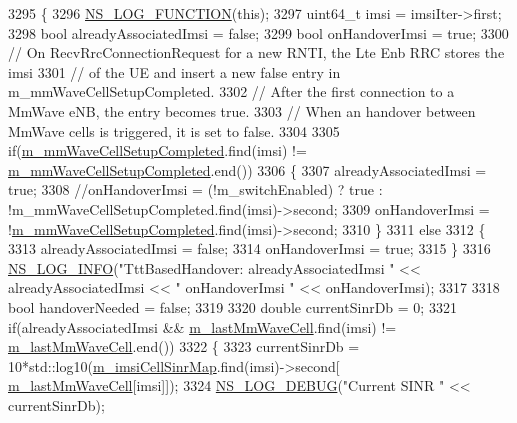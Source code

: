 \begin{DoxyCode}
3295 \{
3296  \hyperlink{log-macros-disabled_8h_a90b90d5bad1f39cb1b64923ea94c0761}{NS\_LOG\_FUNCTION}(\textcolor{keyword}{this});
3297         uint64\_t imsi = imsiIter->first;
3298   \textcolor{keywordtype}{bool} alreadyAssociatedImsi = \textcolor{keyword}{false};
3299   \textcolor{keywordtype}{bool} onHandoverImsi = \textcolor{keyword}{true};
3300   \textcolor{comment}{// On RecvRrcConnectionRequest for a new RNTI, the Lte Enb RRC stores the imsi}
3301   \textcolor{comment}{// of the UE and insert a new false entry in m\_mmWaveCellSetupCompleted.}
3302   \textcolor{comment}{// After the first connection to a MmWave eNB, the entry becomes true.}
3303   \textcolor{comment}{// When an handover between MmWave cells is triggered, it is set to false.}
3304 
3305   \textcolor{keywordflow}{if}(\hyperlink{classns3_1_1LteEnbRrc_ad19d6f4c123115e1d13e34609781ab20}{m\_mmWaveCellSetupCompleted}.find(imsi) != 
      \hyperlink{classns3_1_1LteEnbRrc_ad19d6f4c123115e1d13e34609781ab20}{m\_mmWaveCellSetupCompleted}.end())
3306   \{
3307     alreadyAssociatedImsi = \textcolor{keyword}{true};
3308     \textcolor{comment}{//onHandoverImsi = (!m\_switchEnabled) ? true : !m\_mmWaveCellSetupCompleted.find(imsi)->second;}
3309     onHandoverImsi = !\hyperlink{classns3_1_1LteEnbRrc_ad19d6f4c123115e1d13e34609781ab20}{m\_mmWaveCellSetupCompleted}.find(imsi)->second;
3310   \}
3311   \textcolor{keywordflow}{else}
3312   \{
3313     alreadyAssociatedImsi = \textcolor{keyword}{false};
3314     onHandoverImsi = \textcolor{keyword}{true};
3315   \}
3316   \hyperlink{group__logging_gafbd73ee2cf9f26b319f49086d8e860fb}{NS\_LOG\_INFO}(\textcolor{stringliteral}{"TttBasedHandover: alreadyAssociatedImsi "} << alreadyAssociatedImsi << \textcolor{stringliteral}{"
       onHandoverImsi "} << onHandoverImsi);
3317 
3318   \textcolor{keywordtype}{bool} handoverNeeded = \textcolor{keyword}{false};
3319 
3320   \textcolor{keywordtype}{double} currentSinrDb = 0;
3321   \textcolor{keywordflow}{if}(alreadyAssociatedImsi && \hyperlink{classns3_1_1LteEnbRrc_a0d7b04f0383b0dc3f6a7360b87cbaeee}{m\_lastMmWaveCell}.find(imsi) != 
      \hyperlink{classns3_1_1LteEnbRrc_a0d7b04f0383b0dc3f6a7360b87cbaeee}{m\_lastMmWaveCell}.end())
3322   \{
3323     currentSinrDb = 10*std::log10(\hyperlink{classns3_1_1LteEnbRrc_a72b3ce5c1f8495e96bfc0f384ecf3a96}{m\_imsiCellSinrMap}.find(imsi)->second[
      \hyperlink{classns3_1_1LteEnbRrc_a0d7b04f0383b0dc3f6a7360b87cbaeee}{m\_lastMmWaveCell}[imsi]]);
3324     \hyperlink{group__logging_ga413f1886406d49f59a6a0a89b77b4d0a}{NS\_LOG\_DEBUG}(\textcolor{stringliteral}{"Current SINR "} << currentSinrDb);

\end{DoxyCode}
